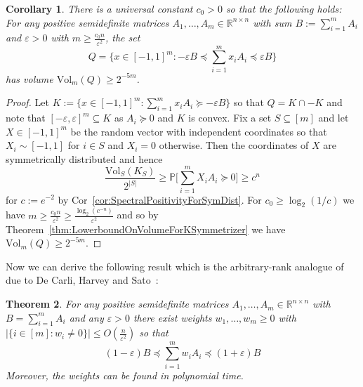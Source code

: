 \documentclass[12pt,english]{article}
\theoremstyle{theorem}
\newtheorem{theorem}{Theorem}
\newtheorem{corollary}[theorem]{Corollary}
\theoremstyle{remark}
\providecommand{\setR}{\mathbb{R}}
\newcommand{\Vol}{\mathrm{Vol}}
\newcommand{\eps}{\varepsilon}
\begin{document}
\begin{corollary} \label{cor:VolumeSymmetricPSD}
There is a universal constant $c_0>0$ so that the following holds:
For any positive semidefinite matrices $A_1, \dots, A_m \in \setR^{n \times n}$ with sum $B := \sum_{i=1}^m A_i$ and $\eps > 0$ with $m \ge \frac{c_0n}{\eps^2}$, the set
\[
  Q = \Big\{ x \in [-1,1]^m : -\eps B \preceq \sum_{i=1}^m x_i A_i \preceq \eps B \Big\}
\]
has volume $\Vol_m (Q) \ge 2^{-5m}$.
\end{corollary}
\begin{proof}
  Let $K := \Big\{x \in [-1,1]^m : \sum_{i=1}^m x_iA_i \succeq -\eps B\Big\}$ so that $Q = K \cap -K$ and note that $[-\eps, \eps]^m \subseteq K$ as $A_i \succeq 0$ and $K$ is convex. %
  Fix a set $S \subseteq [m]$ and let $X \in [-1,1]^m$ be the random vector with independent coordinates so that
  $X_i \sim [-1,1]$ for $i \in S$ and $X_i = 0$ otherwise. Then the coordinates of $X$ are symmetrically
  distributed and hence
  \[\frac{\Vol_S (K_S)}{2^{|S|}} \geq \mathbb{P}\Big[\sum_{i=1}^m X_iA_i \succeq 0 \Big] \ge c^n
  \]
  for $c := e^{-2}$
  by Cor~\ref{cor:SpectralPositivityForSymDist}.
    For $c_0 \geq \log_2(1/c)$ we have $m \geq \frac{c_0n}{\varepsilon^2} \geq \frac{\log_2(c^{-n})}{\varepsilon^2}$ and so by Theorem~\ref{thm:LowerboundOnVolumeForKSymmetrizer} we have $\Vol_m(Q) \ge 2^{-5m}$.
\end{proof}



Now we can derive the following result which is the arbitrary-rank analogue of \cite{BatsonSpielmanSrivastavaSTOC2009,BatsonSpielmanSrivastava2012} due to De Carli, Harvey and Sato~\cite{SparseSumsOfPSDMatricesDeCarliHarveySato2015}:
\begin{theorem} \label{thm:PSDSparsifier}
  For any positive semidefinite matrices $A_1, \dots, A_m \in \setR^{n \times n}$ with $B = \sum_{i=1}^m A_i$ and any $\eps >0$ there exist weights $w_1, \dots, w_m \ge 0$ with $|\{i \in [m] : w_i \ne 0\}| \le O(\frac{n}{\eps^2})$ so that
  \[
    (1-\eps) B \preceq \sum_{i=1}^m w_iA_i \preceq (1+\eps) B
  \]
Moreover, the weights can be found in polynomial time.
\end{theorem}
\end{document}

